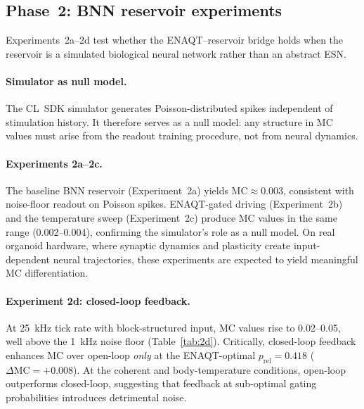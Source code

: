 \documentclass[twocolumn,11pt]{article}
\newcommand{\MC}{\mathrm{MC}}
\begin{document}
\subsection{Phase~2: BNN reservoir experiments}

Experiments~2a--2d test whether the ENAQT--reservoir bridge
holds when the reservoir is a simulated biological neural
network rather than an abstract ESN.

\paragraph{Simulator as null model.}
The CL~SDK simulator generates Poisson-distributed spikes
independent of stimulation history.  It therefore serves as a
null model: any structure in MC values must arise from the
readout training procedure, not from neural dynamics.

\paragraph{Experiments 2a--2c.}
The baseline BNN reservoir (Experiment~2a) yields
$\MC \approx 0.003$, consistent with noise-floor readout on
Poisson spikes.  ENAQT-gated driving (Experiment~2b) and the
temperature sweep (Experiment~2c) produce MC values in the same
range (0.002--0.004), confirming the simulator's role as a null
model.  On real organoid hardware, where synaptic dynamics and
plasticity create input-dependent neural trajectories, these
experiments are expected to yield meaningful MC differentiation.

\paragraph{Experiment 2d: closed-loop feedback.}
At \SI{25}{\kilo\hertz} tick rate with block-structured input,
MC values rise to 0.02--0.05, well above the \SI{1}{\kilo\hertz}
noise floor (Table~\ref{tab:2d}).  Critically, closed-loop
feedback enhances MC over open-loop \emph{only} at the
ENAQT-optimal $p_{\mathrm{rel}} = 0.418$
($\Delta\MC = +0.008$).  At the coherent and body-temperature
conditions, open-loop outperforms closed-loop, suggesting that
feedback at sub-optimal gating probabilities introduces
detrimental noise.
\end{document}
